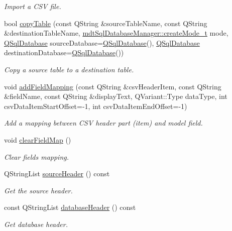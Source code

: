 \begin{DoxyCompactItemize}
\begin{DoxyCompactList}\small\item\em Import a C\-S\-V file. \end{DoxyCompactList}\item 
bool \hyperlink{classmdt_data_table_manager_a5c8aaf4f42a50bd0c216ef29adc9d79f}{copy\-Table} (const Q\-String \&source\-Table\-Name, const Q\-String \&destination\-Table\-Name, \hyperlink{classmdt_sql_database_manager_a2f5b46d67a88095053a5edfc415c7418}{mdt\-Sql\-Database\-Manager\-::create\-Mode\-\_\-t} mode, \hyperlink{class_q_sql_database}{Q\-Sql\-Database} source\-Database=\hyperlink{class_q_sql_database}{Q\-Sql\-Database}(), \hyperlink{class_q_sql_database}{Q\-Sql\-Database} destination\-Database=\hyperlink{class_q_sql_database}{Q\-Sql\-Database}())
\begin{DoxyCompactList}\small\item\em Copy a source table to a destination table. \end{DoxyCompactList}\item 
void \hyperlink{classmdt_data_table_manager_a2b38e6a8157183fcbce0770d12e9aa9d}{add\-Field\-Mapping} (const Q\-String \&csv\-Header\-Item, const Q\-String \&field\-Name, const Q\-String \&display\-Text, Q\-Variant\-::\-Type data\-Type, int csv\-Data\-Item\-Start\-Offset=-\/1, int csv\-Data\-Item\-End\-Offset=-\/1)
\begin{DoxyCompactList}\small\item\em Add a mapping between C\-S\-V header part (item) and model field. \end{DoxyCompactList}\item 
void \hyperlink{classmdt_data_table_manager_a10c9f9d57d6c35fa5721906c79376ec4}{clear\-Field\-Map} ()
\begin{DoxyCompactList}\small\item\em Clear fields mapping. \end{DoxyCompactList}\item 
Q\-String\-List \hyperlink{classmdt_data_table_manager_a5cafc38a5570c51757dbac7e8c2fd978}{source\-Header} () const 
\begin{DoxyCompactList}\small\item\em Get the source header. \end{DoxyCompactList}\item 
const Q\-String\-List \hyperlink{classmdt_data_table_manager_a0edc657a7dbcfcf251e6ce27560d40e5}{database\-Header} () const 
\begin{DoxyCompactList}\small\item\em Get database header. \end{DoxyCompactList}\item 

\end{DoxyCompactItemize}
